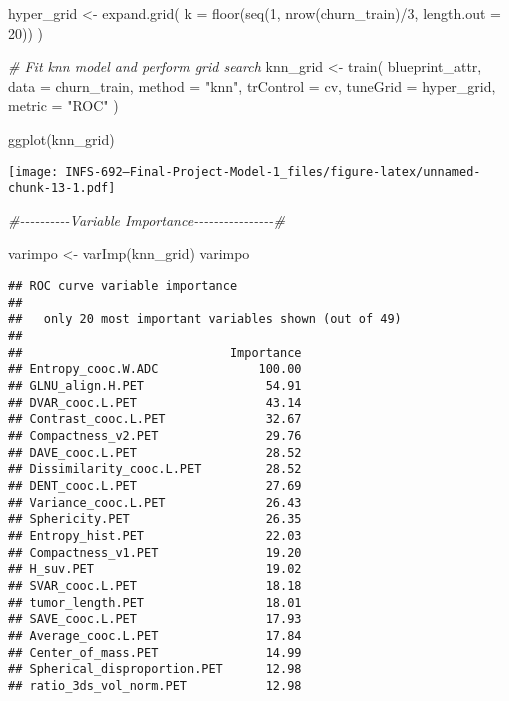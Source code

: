 \documentclass[
]{article}
\newenvironment{Shaded}{\begin{snugshade}}{\end{snugshade}}
\newcommand{\AttributeTok}[1]{\textcolor[rgb]{0.77,0.63,0.00}{#1}}
\newcommand{\CommentTok}[1]{\textcolor[rgb]{0.56,0.35,0.01}{\textit{#1}}}
\newcommand{\DecValTok}[1]{\textcolor[rgb]{0.00,0.00,0.81}{#1}}
\newcommand{\FunctionTok}[1]{\textcolor[rgb]{0.00,0.00,0.00}{#1}}
\newcommand{\NormalTok}[1]{#1}
\newcommand{\OtherTok}[1]{\textcolor[rgb]{0.56,0.35,0.01}{#1}}
\newcommand{\SpecialCharTok}[1]{\textcolor[rgb]{0.00,0.00,0.00}{#1}}
\newcommand{\StringTok}[1]{\textcolor[rgb]{0.31,0.60,0.02}{#1}}
\begin{document}
\begin{Shaded}
\begin{Highlighting}[]
\NormalTok{hyper\_grid }\OtherTok{\textless{}{-}} \FunctionTok{expand.grid}\NormalTok{(}
  \AttributeTok{k =} \FunctionTok{floor}\NormalTok{(}\FunctionTok{seq}\NormalTok{(}\DecValTok{1}\NormalTok{, }\FunctionTok{nrow}\NormalTok{(churn\_train)}\SpecialCharTok{/}\DecValTok{3}\NormalTok{, }\AttributeTok{length.out =} \DecValTok{20}\NormalTok{))}
\NormalTok{)}

\CommentTok{\# Fit knn model and perform grid search}
\NormalTok{knn\_grid }\OtherTok{\textless{}{-}} \FunctionTok{train}\NormalTok{(}
\NormalTok{  blueprint\_attr, }
  \AttributeTok{data =}\NormalTok{ churn\_train, }
  \AttributeTok{method =} \StringTok{"knn"}\NormalTok{, }
  \AttributeTok{trControl =}\NormalTok{ cv, }
  \AttributeTok{tuneGrid =}\NormalTok{ hyper\_grid,}
  \AttributeTok{metric =} \StringTok{"ROC"}
\NormalTok{)}

\FunctionTok{ggplot}\NormalTok{(knn\_grid)}
\end{Highlighting}
\end{Shaded}

\texttt{[image: INFS-692---Final-Project-Model-1\_files/figure-latex/unnamed-chunk-13-1.pdf]}

\begin{Shaded}
\begin{Highlighting}[]
\CommentTok{\#{-}{-}{-}{-}{-}{-}{-}{-}{-}{-}Variable Importance{-}{-}{-}{-}{-}{-}{-}{-}{-}{-}{-}{-}{-}{-}{-}{-}\#}

\NormalTok{varimpo }\OtherTok{\textless{}{-}} \FunctionTok{varImp}\NormalTok{(knn\_grid)}
\NormalTok{varimpo}
\end{Highlighting}
\end{Shaded}

\begin{verbatim}
## ROC curve variable importance
## 
##   only 20 most important variables shown (out of 49)
## 
##                             Importance
## Entropy_cooc.W.ADC              100.00
## GLNU_align.H.PET                 54.91
## DVAR_cooc.L.PET                  43.14
## Contrast_cooc.L.PET              32.67
## Compactness_v2.PET               29.76
## DAVE_cooc.L.PET                  28.52
## Dissimilarity_cooc.L.PET         28.52
## DENT_cooc.L.PET                  27.69
## Variance_cooc.L.PET              26.43
## Sphericity.PET                   26.35
## Entropy_hist.PET                 22.03
## Compactness_v1.PET               19.20
## H_suv.PET                        19.02
## SVAR_cooc.L.PET                  18.18
## tumor_length.PET                 18.01
## SAVE_cooc.L.PET                  17.93
## Average_cooc.L.PET               17.84
## Center_of_mass.PET               14.99
## Spherical_disproportion.PET      12.98
## ratio_3ds_vol_norm.PET           12.98
\end{verbatim}
\end{document}
